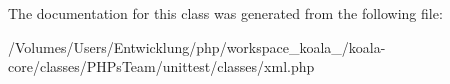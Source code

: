 The documentation for this class was generated from the following file:\begin{DoxyCompactItemize}
\item 
/Volumes/Users/Entwicklung/php/workspace\_\-koala\_/koala-\/core/classes/PHPsTeam/unittest/classes/xml.php\end{DoxyCompactItemize}
